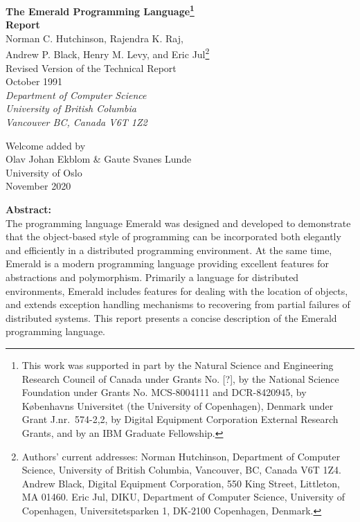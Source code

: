 \begin{titlepage}
\vspace*{0.16in}
\begin{center}
\Large
{\bf The Emerald Programming Language\footnote{This work was
supported in part
by the Natural Science and Engineering Research Council of Canada under
Grants No. [?],
by the National Science Foundation under Grants No.
MCS-8004111 and DCR-8420945, by
K{\o}benhavns Universitet (the University of Copenhagen), Denmark under
Grant J.nr.\ 574-2,2, by Digital Equipment Corporation
External Research Grants, and by an IBM Graduate Fellowship.}} \\[0.1in]
\large
{\bf Report} \\
\large
\vspace{2.5ex}
Norman C. Hutchinson, Rajendra K. Raj, \\
Andrew P. Black, Henry M. Levy, and Eric Jul\footnote{Authors' current
addresses:
Norman Hutchinson, Department of Computer Science, University of
British Columbia, Vancouver, BC, Canada V6T 1Z4.
Andrew Black, Digital Equipment Corporation, 550 King Street, Littleton, MA 01460.
Eric Jul, DIKU, Department of Computer Science, University of Copenhagen,
Universitetsparken 1, DK-2100 Copenhagen, Denmark.} \\[0.5in]
\normalsize
Revised Version of the Technical Report\\
October 1991\\[0.5in]
{\em Department of Computer Science \\
University of British Columbia \\
Vancouver BC, Canada V6T 1Z2} \\

\vspace*{0.2in}

\footnotesize
Welcome added by \\
Olav Johan Ekblom \& Gaute Svanes Lunde \\
University of Oslo \\
November 2020 \\
\large
\vspace{2.5ex}
\end{center}
\vspace*{0.4in}

\begin{center}
\parbox{6.0in}{
{\bf Abstract:}\\[0.15in]
The programming language Emerald was designed and developed to demonstrate
that the object-based style of programming can be incorporated both
elegantly and efficiently in a distributed programming environment.  At
the same time, Emerald is a modern programming language providing excellent
features for abstractions and polymorphism.  Primarily a language for
distributed environments, Emerald includes features for dealing with the
location of objects, and extends exception handling mechanisms to
recovering from partial failures of distributed systems.  This report
presents a concise description of the Emerald programming language.
}
\end{center}
\end{titlepage}
